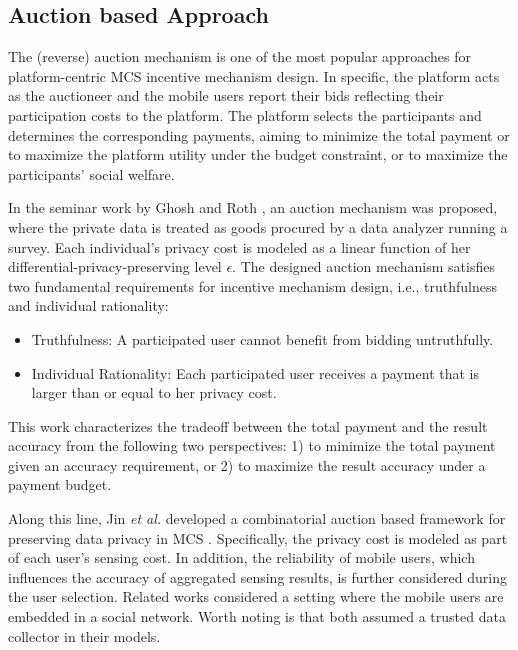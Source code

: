 \subsection{Auction based Approach}
The (reverse) auction mechanism is one of the most popular approaches for platform-centric MCS incentive mechanism design. In specific, the platform acts as the auctioneer and the mobile users report their bids reflecting their participation costs to the platform. The platform selects the participants and determines the corresponding payments, aiming to minimize the total payment or to maximize the platform utility under the budget constraint, or to maximize the participants' social welfare\cite{DejunJ}. 

In the seminar work by Ghosh and Roth \cite{ghosh2015selling}, an auction mechanism was proposed, where the private data is treated as goods procured by a data analyzer running a survey. Each individual's privacy cost is modeled as a linear function of her differential-privacy-preserving level $\epsilon$. The designed auction mechanism satisfies two fundamental requirements for incentive mechanism design, i.e., truthfulness and individual rationality:
\begin{itemize}
\item Truthfulness: A participated user cannot benefit from bidding untruthfully.
\item Individual Rationality: Each participated user receives a payment that is larger than or equal to her privacy cost.
\end{itemize}
This work\cite{ghosh2015selling} characterizes the tradeoff between the total payment and the result accuracy from the following two perspectives: 1) to minimize the total payment given an accuracy requirement, or 2) to maximize the result accuracy under a payment budget. 

Along this line, Jin \textsl{et al.} developed a combinatorial auction based framework for preserving data privacy in MCS \cite{jin2016}. Specifically, the privacy cost is modeled as part of each user's sensing cost. In addition, the reliability of mobile users, which influences the accuracy of aggregated sensing results, is further considered during the user selection. Related works \cite{zhang2016privacy} considered a setting where the mobile users are embedded in a social network. Worth noting is that both assumed a trusted data collector in their models.


